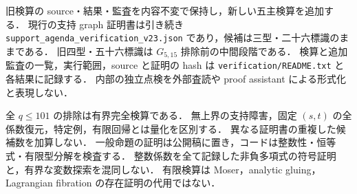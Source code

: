 \documentclass[11pt,a4paper]{article}
\begin{document}
旧検算の source・結果・監査を内容不変で保持し，新しい五主検算を追加する．
現行の支持 graph 証明書は引き続き
\nolinkurl{support_agenda_verification_v23.json} であり，候補は三型・二十六標識のままである．
旧四型・五十六標識は $G_{5,15}$ 排除前の中間段階である．
検算と追加監査の一覧，実行範囲，source と証明の hash は
\nolinkurl{verification/README.txt} と各結果に記録する．
内部の独立点検を外部査読や proof assistant による形式化と表現しない．

全 $q\le101$ の排除は有界完全検算である．
無上界の支持障害，固定 $(s,t)$ の全係数復元，特定例，有限回帰とは量化を区別する．
異なる証明書の重複した候補数を加算しない．
一般命題の証明は公開稿に置き，コードは整数性・恒等式・有限型分解を検査する．
整数係数を全て記録した非負多項式の符号証明と，有界な変数探索を混同しない．
有限検算は Moser，analytic gluing，Lagrangian fibration の存在証明の代用ではない．


\end{document}

